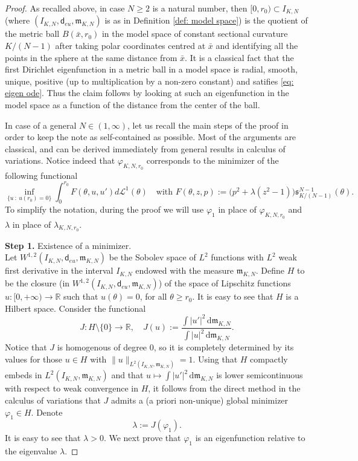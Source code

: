 \documentclass[12pt]{article}
\newcommand{\R}{\mathbb{R}}
\newcommand{\dd}{\mathrm{d}}
\newcommand{\mm}{\mathfrak m}
\newcommand{\di}{\mathsf{d}}
\theoremstyle{plain}
\theoremstyle{definition}
\begin{document}
\begin{proof}
As recalled above, in case $N\geq 2$ is a natural number, then $[0,r_0)\subset I_{K,N}$ (where  $(I_{K,N},\di_{eu},\mm_{K,N})$ is as in Definition \ref{def: model space})  is the quotient of the metric ball $B(\bar{x}, r_0)$ in the model space of constant sectional curvature $K/(N-1)$ after taking polar coordinates centred at $\bar{x}$ and identifying all the points in the sphere at the same distance from $\bar{x}$. It is a classical fact that the first Dirichlet eigenfunction in a metric ball in a model space is radial, smooth, unique, positive (up to multiplication by a non-zero constant) and satifies \eqref{eq: eigen ode}. Thus the claim follows by looking at such an eigenfunction in the model space as a function of the distance from the center of the ball.

 In case of a general $N\in (1,\infty)$, let us recall the main steps of the proof in order to keep the note as self-contained as possible. Most of the arguments are classical, and can be derived immediately from general results in calculus of variations. Notice indeed that $\varphi_{K,N,r_0}$ corresponds to the minimizer of the following functional
 \[\inf_{\{u \ : \ u(r_0)=0\}}\int_0^{r_0}F(\theta,u,u')d\mathcal{L}^1(\theta) \quad \textrm{with }  F(\theta,z,p):=\big(p^2+\lambda(z^2-1)\big)\mathfrak{s}^{N-1}_{K/(N-1)}(\theta).\]
 To simplify the notation, during the proof we will use $\varphi_1$ in place of $\varphi_{K,N,r_0}$ and $\lambda$ in place of $\lambda_{K,N,r_0}$.


 \textbf{Step 1.} Existence of a minimizer.
\\Let $W^{1,2}(I_{K,N},\di_{eu},\mm_{K,N})$ be the Sobolev space of $L^2$ functions with $L^2$ weak first derivative in the interval $I_{K,N}$ endowed with the measure $\mm_{K,N}$. Define $H$ to be the closure (in $W^{1,2}(I_{K,N},\di_{eu},\mm_{K,N})$) of the space of Lipschitz functions $u:[0,+\infty)\rightarrow \R$ such that $u(\theta)=0$, for all  $\theta\geq r_0$. It is easy to see that $H$ is a Hilbert space. Consider the functional
\begin{equation}\label{eq:defJ}
J: H\setminus\{0\}\to \R, \quad J(u):= \frac{\int |u'|^2 \,  \dd \mm_{K,N}}{ \int |u|^2 \,  \dd \mm_{K,N} }.
\end{equation}
Notice that $J$ is homogenous of degree $0$, so it is completely determined by its values for those $u\in H$ with $\|u\|_{L^2(I_{K,N},\mm_{K,N})}=1$.
Using that $H$ compactly embeds in $L^2(I_{K,N},\mm_{K,N})$ and that $u\mapsto \int |u'|^2 \,  \dd \mm_{K,N}$ is lower semicontinuous with respect to weak convergence in $H$, it follows from the direct method in the calculus of variations that $J$ admits a (a priori non-unique) global minimizer $\varphi_1\in H$. Denote
\begin{equation}\label{eq:dellambda}
\lambda:=J(\varphi_1).
\end{equation}
It is easy to see that $\lambda>0$. We next prove that $\varphi_1$ is an eigenfunction relative to the eigenvalue $\lambda$.
\medskip


\end{proof}
\end{document}
